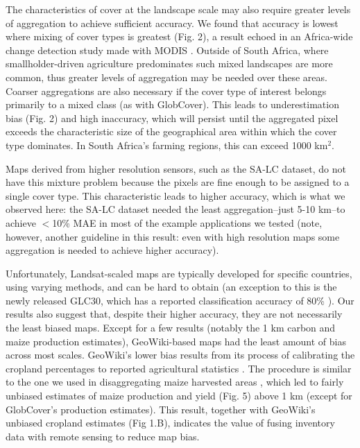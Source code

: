 \documentclass{pnastwo}
\begin{document}
\begin{article}
The characteristics of cover at the landscape scale may also require greater levels of aggregation to achieve sufficient accuracy. We found that accuracy is lowest where mixing of cover types is greatest (Fig. 2), a result echoed in an Africa-wide change detection study made with MODIS \cite{gross_monitoring_2013}. Outside of South Africa, where smallholder-driven agriculture predominates \cite{lambin_estimating_????} such mixed landscapes are more common, thus greater levels of aggregation may be needed over these areas. Coarser aggregations are also necessary if the cover type of interest belongs primarily to a mixed class (as with GlobCover). This leads to underestimation bias (Fig. 2) and high inaccuracy, which will persist until the aggregated pixel exceeds the characteristic size of the geographical area within which the cover type dominates. In South Africa's farming regions, this can exceed 1000 km$^2$. 

Maps derived from higher resolution sensors, such as the SA-LC dataset, do not have this mixture problem because the pixels are fine enough to be assigned to a single cover type. This characteristic leads to higher accuracy, which is what we observed here: the SA-LC dataset needed the least aggregation--just 5-10 km--to achieve $<$10\% MAE in most of the example applications we tested (note, however, another guideline in this result: even with high resolution maps some aggregation is needed to achieve higher accuracy).


Unfortunately, Landsat-scaled maps are typically developed for specific countries, using varying methods, and can be hard to obtain (an exception to this is the newly released GLC30, which has a reported classification accuracy of 80\% \cite{chen_global_2015}). Our results also suggest that, despite their higher accuracy, they are not necessarily the least biased maps. Except for a few results (notably the 1 km carbon and maize production estimates), GeoWiki-based maps had the least amount of bias across most scales. GeoWiki's lower bias results from its process of calibrating the cropland percentages to reported agricultural statistics \cite{fritz_cropland_2011,fritz_mapping_2015}.  The procedure is similar to the one we used in disaggregating maize harvested areas \cite{ramankutty_farming_2008, monfreda_farming_2008}, which led to fairly unbiased estimates of maize production and yield (Fig. 5) above 1 km (except for GlobCover's production estimates). This result, together with GeoWiki's unbiased cropland estimates (Fig 1.B), indicates the value of fusing inventory data with remote sensing to reduce map bias. 


\end{article}
\end{document}
